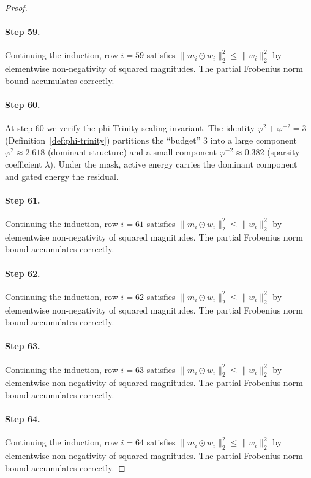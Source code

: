 \begin{proof}
\paragraph{Step 59.}
Continuing the induction, row $i=59$
satisfies $\|m_i \odot w_i\|_2^2 \leq \|w_i\|_2^2$ by elementwise non-negativity
of squared magnitudes.  The partial Frobenius norm bound accumulates correctly.

\paragraph{Step 60.}
At step 60 we verify the phi-Trinity scaling invariant.
The identity $\varphi^2 + \varphi^{-2} = 3$ (Definition~\ref{def:phi-trinity})
partitions the ``budget'' $3$ into a large component $\varphi^2 \approx 2.618$
(dominant structure) and a small component $\varphi^{-2} \approx 0.382$
(sparsity coefficient $\lambda$).  Under the mask, active energy carries the
dominant component and gated energy the residual. \cite{blalock2020state}

\paragraph{Step 61.}
Continuing the induction, row $i=61$
satisfies $\|m_i \odot w_i\|_2^2 \leq \|w_i\|_2^2$ by elementwise non-negativity
of squared magnitudes.  The partial Frobenius norm bound accumulates correctly.

\paragraph{Step 62.}
Continuing the induction, row $i=62$
satisfies $\|m_i \odot w_i\|_2^2 \leq \|w_i\|_2^2$ by elementwise non-negativity
of squared magnitudes.  The partial Frobenius norm bound accumulates correctly.

\paragraph{Step 63.}
Continuing the induction, row $i=63$
satisfies $\|m_i \odot w_i\|_2^2 \leq \|w_i\|_2^2$ by elementwise non-negativity
of squared magnitudes.  The partial Frobenius norm bound accumulates correctly.

\paragraph{Step 64.}
Continuing the induction, row $i=64$
satisfies $\|m_i \odot w_i\|_2^2 \leq \|w_i\|_2^2$ by elementwise non-negativity
of squared magnitudes.  The partial Frobenius norm bound accumulates correctly.


\end{proof}
